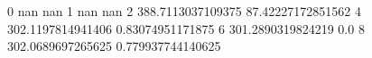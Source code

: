 0 nan nan
1 nan nan
2 388.7113037109375 87.42227172851562
4 302.1197814941406 0.83074951171875
6 301.2890319824219 0.0
8 302.0689697265625 0.779937744140625
